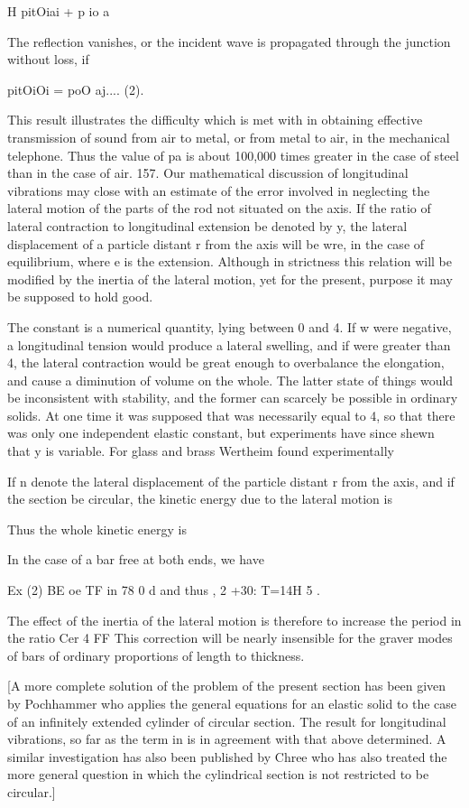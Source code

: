 H pitOiai + p io a

The reflection vanishes, or the incident wave is propagated through the
junction without loss, if

pitOiOi = poO aj.... (2).

This result illustrates the difficulty which is met with in obtaining
effective transmission of sound from air to metal, or from metal to air,
in the mechanical telephone. Thus the value of pa is about 100,000 times
greater in the case of steel than in the case of air.
157. Our mathematical discussion of longitudinal vibrations may close
with an estimate of the error involved in neglecting the lateral motion
of the parts of the rod not situated on the
axis. If the ratio of lateral contraction to longitudinal extension be
denoted by y, the lateral displacement of a particle distant r from the
axis will be
wre,
in the case of equilibrium, where e is the extension.
Although in strictness this relation will be modified by the inertia of
the lateral motion, yet for the present, purpose it may be supposed to
hold good.


The constant is a numerical quantity, lying between 0 and 4. If w were
negative, a longitudinal tension would produce a lateral swelling, and
if were greater than 4, the lateral contraction would be great enough to
overbalance the elongation, and cause a diminution of volume on the
whole. The latter state of things would be inconsistent with stability,
and the former can scarcely be possible in ordinary solids. At one time
it was supposed that was necessarily equal to 4, so that there was only
one independent elastic constant, but experiments have since shewn that
y is variable. For glass and brass Wertheim found experimentally

If n denote the lateral displacement of the particle distant r from the
axis, and if the section be circular, the kinetic energy due to the
lateral motion is

Thus the whole kinetic energy is

In the case of a bar free at both ends, we have

Ex (2) BE oe TF in 78 0 d and thus , 2 +30: T=14H 5 .

The effect of the inertia of the lateral motion is therefore to increase
the period in the ratio Cer 4 FF This correction will be nearly
insensible for the graver modes of bars of ordinary proportions of
length to thickness.

[A more complete solution of the problem of the present section has been given
by Pochhammer who applies the general equations for an elastic solid to the
case of an infinitely extended cylinder of circular section. The result for
longitudinal vibrations, so far as the term in is in agreement with that above
determined. A similar investigation has also been published by Chree who has
also treated the more general question in which the cylindrical section is not
restricted to be circular.]

